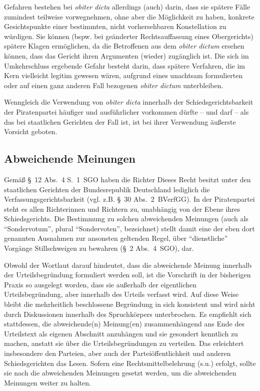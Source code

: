 Gefahren bestehen bei \emph{obiter dicta} allerdings (auch) darin, dass sie spätere Fälle zumindest teilweise vorwegnehmen, ohne aber die Möglichkeit zu haben, konkrete Gesichtspunkte einer bestimmten, nicht vorhersehbaren Konstellation zu würdigen.
Sie können (bspw. bei geänderter Rechtsauffassung eines Obergerichts) spätere Klagen ermöglichen, da die Betroffenen aus dem \emph{obiter dictum} ersehen können, dass das Gericht ihren Argumenten (wieder) zugänglich ist.
Die sich im Umkehrschluss ergebende Gefahr besteht darin, dass spätere Verfahren, die im Kern vielleicht legitim gewesen wären, aufgrund eines unachtsam formulierten oder auf einen ganz anderen Fall bezogenen \emph{obiter dictum} unterbleiben.

Wenngleich die Verwendung von \emph{obiter dicta} innerhalb der Schiedsgerichtsbarkeit der Piratenpartei häufiger und ausführlicher vorkommen dürfte – und darf – als das bei staatlichen Gerichten der Fall ist, ist bei ihrer Verwendung äußerste Vorsicht geboten.

\subsection{Abweichende Meinungen}
\label{Urteilsaufbau:Sondervoten}
Gemäß \S~12 Abs.~4 S.~1~SGO haben die Richter 
Dieses Recht besitzt unter den staatlichen Gerichten der Bundesrepublik Deutschland lediglich die Verfassungsgerichtsbarkeit (vgl. z.B. \S~30 Abs.~2~BVerfGG).
In der Piratenpartei steht es allen Richterinnen und Richtern zu, unabhängig von der Ebene ihres Schiedsgerichts.
Die Bestimmung zu solchen abweichenden Meinungen (auch als \enquote{Sondervotum}, plural \enquote{Sondervoten}, bezeichnet) stellt damit eine der eben dort genannten Ausnahmen zur ansonsten geltenden Regel, über \enquote{dienstliche} Vorgänge Stillschweigen zu bewahren (\S~2 Abs.~4~SGO), dar.

Obwohl der Wortlaut darauf hindeutet, dass die abweichende Meinung innerhalb der Urteilsbegründung formuliert werden soll, ist die Vorschrift in der bisherigen Praxis so ausgelegt worden, dass sie außerhalb der eigentlichen Urteilsbegründung, aber innerhalb des Urteils verfasst wird.
Auf diese Weise bleibt die mehrheitlich beschlossene Begründung in sich konsistent und wird nicht durch Diskussionen innerhalb des Spruchkörpers unterbrochen.
Es empfiehlt sich stattdessen, die abweichende(n) Meinung(en) zusammenhängend ans Ende des Urteilstext als eigenen Abschnitt anzuhängen und sie gesondert kenntlich zu machen, anstatt sie über die Urteilsbegründungen zu verteilen.
Das erleichtert insbesondere den Parteien, aber auch der Parteiöffentlichkeit und anderen Schiedsgerichten das Lesen.
Sofern eine Rechtsmittelbelehrung (s.u.) erfolgt, sollte sie nach die abweichenden Meinungen gesetzt werden, um die abweichenden Meinungen weiter  zu halten.

